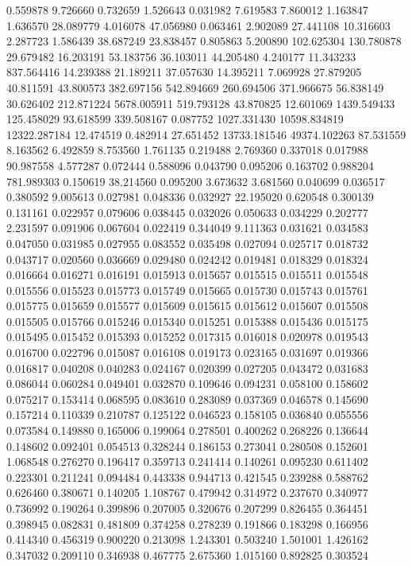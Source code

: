 0.559878
9.726660
0.732659
1.526643
0.031982
7.619583
7.860012
1.163847
1.636570
28.089779
4.016078
47.056980
0.063461
2.902089
27.441108
10.316603
2.287723
1.586439
38.687249
23.838457
0.805863
5.200890
102.625304
130.780878
29.679482
16.203191
53.183756
36.103011
44.205480
4.240177
11.343233
837.564416
14.239388
21.189211
37.057630
14.395211
7.069928
27.879205
40.811591
43.800573
382.697156
542.894669
260.694506
371.966675
56.838149
30.626402
212.871224
5678.005911
519.793128
43.870825
12.601069
1439.549433
125.458029
93.618599
339.508167
0.087752
1027.331430
10598.834819
12322.287184
12.474519
0.482914
27.651452
13733.181546
49374.102263
87.531559
8.163562
6.492859
8.753560
1.761135
0.219488
2.769360
0.337018
0.017988
90.987558
4.577287
0.072444
0.588096
0.043790
0.095206
0.163702
0.988204
781.989303
0.150619
38.214560
0.095200
3.673632
3.681560
0.040699
0.036517
0.380592
9.005613
0.027981
0.048336
0.032927
22.195020
0.620548
0.300139
0.131161
0.022957
0.079606
0.038445
0.032026
0.050633
0.034229
0.202777
2.231597
0.091906
0.067604
0.022419
0.344049
9.111363
0.031621
0.034583
0.047050
0.031985
0.027955
0.083552
0.035498
0.027094
0.025717
0.018732
0.043717
0.020560
0.036669
0.029480
0.024242
0.019481
0.018329
0.018324
0.016664
0.016271
0.016191
0.015913
0.015657
0.015515
0.015511
0.015548
0.015556
0.015523
0.015773
0.015749
0.015665
0.015730
0.015743
0.015761
0.015775
0.015659
0.015577
0.015609
0.015615
0.015612
0.015607
0.015508
0.015505
0.015766
0.015246
0.015340
0.015251
0.015388
0.015436
0.015175
0.015495
0.015452
0.015393
0.015252
0.017315
0.016018
0.020978
0.019543
0.016700
0.022796
0.015087
0.016108
0.019173
0.023165
0.031697
0.019366
0.016817
0.040208
0.040283
0.024167
0.020399
0.027205
0.043472
0.031683
0.086044
0.060284
0.049401
0.032870
0.109646
0.094231
0.058100
0.158602
0.075217
0.153414
0.068595
0.083610
0.283089
0.037369
0.046578
0.145690
0.157214
0.110339
0.210787
0.125122
0.046523
0.158105
0.036840
0.055556
0.073584
0.149880
0.165006
0.199064
0.278501
0.400262
0.268226
0.136644
0.148602
0.092401
0.054513
0.328244
0.186153
0.273041
0.280508
0.152601
1.068548
0.276270
0.196417
0.359713
0.241414
0.140261
0.095230
0.611402
0.223301
0.211241
0.094484
0.443338
0.944713
0.421545
0.239288
0.588762
0.626460
0.380671
0.140205
1.108767
0.479942
0.314972
0.237670
0.340977
0.736992
0.190264
0.399896
0.207005
0.320676
0.207299
0.826455
0.364451
0.398945
0.082831
0.481809
0.374258
0.278239
0.191866
0.183298
0.166956
0.414340
0.456319
0.900220
0.213098
1.243301
0.503240
1.501001
1.426162
0.347032
0.209110
0.346938
0.467775
2.675360
1.015160
0.892825
0.303524
